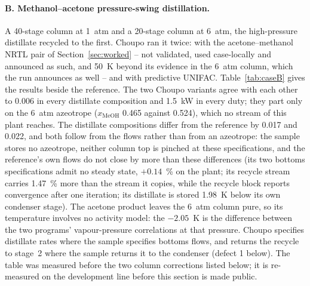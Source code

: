 \documentclass[11pt,a4paper]{article}
\begin{document}
\paragraph{B. Methanol--acetone pressure-swing distillation.}  A 40-stage
column at 1~atm and a 20-stage column at 6~atm, the high-pressure
distillate recycled to the first.  Choupo ran it twice: with the
acetone--methanol NRTL pair of Section~\ref{sec:worked} -- not validated,
used case-locally and announced as such, and 50~K beyond its evidence in
the 6~atm column, which the run announces as well -- and with predictive
UNIFAC.  Table~\ref{tab:caseB} gives the results beside the reference.
The two Choupo variants agree with each other to 0.006 in every distillate
composition and 1.5~kW in every duty; they part only on the 6~atm
azeotrope ($x_\mathrm{MeOH}$ 0.465 against 0.524), which no stream of this
plant reaches.  The distillate compositions differ from the reference by
0.017 and 0.022, and both follow from the flows rather than from an
azeotrope: the sample stores no azeotrope, neither column top is pinched at
these specifications, and the reference's own flows do not close by more
than these differences (its two bottoms specifications admit no steady
state, $+0.14$~\% on the plant; its recycle stream carries 1.47~\% more than
the stream it copies, while the recycle block reports convergence after
one iteration; its distillate is stored 1.98~K below its own condenser
stage).  The acetone product leaves the 6~atm column pure, so its
temperature involves no activity model: the $-2.05$~K is the difference
between the two programs' vapour-pressure correlations at that pressure.
Choupo specifies distillate rates where the sample specifies bottoms flows,
and returns the recycle to stage~2 where the sample returns it to the
condenser (defect 1 below).  The table was measured before the two column
corrections listed below; it is re-measured on the development line before
this section is made public.
\end{document}
